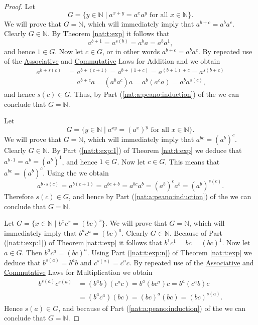 \begin{proof}
	\hfill

	Let
	$$
		G = \{ y \in \mathbb{N} \mid  a^{x + y} = a^x a^y \text{ for all } x \in \mathbb{N} \}.
	$$
	We will prove that $G = \mathbb{N}$, which will immediately imply that $a^{b + c} = a^b a^c$. Clearly $G \in \mathbb{N}$. By Theorem \ref{nat:t:exp} it follows that
	$$
		a^{b + 1} = a^{s(b)} = a^b a = a^b a^1,
	$$
	and hence $1 \in G$. Now let $c \in G$, or in other words $a^{b + c} = a^b a^c$. By repeated use of the \hyperref[nat:t:props:associative_add]{Associative} and \hyperref[nat:t:props:commutative_add]{Commutative} Laws for Addition and  we obtain
	\begin{align*}
		a^{b + s(c)} & = a^{b + (c + 1)} = a^{b + (1 + c)} = a^{(b + 1) + c} = a^{s(b + c)} \\
		             & = a^{b + c} a  = (a^b a^c)a = a^b (a^c a) = a^b a^{s(c)},
	\end{align*}
	and hence $s(c) \in G$. Thus, by Part (\ref{nat:a:peano:induction}) of the  we can conclude that $G = \mathbb{N}$.

	Let
	$$
		G = \{ y \in \mathbb{N} \mid  a^{x y} = (a^x)^y \text{ for all } x \in \mathbb{N} \}.
	$$
	We will prove that $G = \mathbb{N}$, which will immediately imply that $a^{b c} = (a^b)^c$. Clearly $G \in \mathbb{N}$. By Part (\ref{nat:t:exp:1}) of Theorem \ref{nat:t:exp} we deduce that $a^{b \cdot 1} = a^b = (a^b)^1$, and hence $1 \in G$. Now let $c \in G$. This means that $a^{b c} = (a^b)^c$. Using the  we obtain
	$$
		a^{b \cdot s(c)} = a^{b(c + 1)} = a^{b c + b} = a^{b c} a^b = (a^b)^c a^b = (a^b)^{s(c)}.
	$$
	Therefore $s(c) \in G$, and hence by Part (\ref{nat:a:peano:induction}) of the  we can conclude that $G = \mathbb{N}$.

	Let $G = \{ x \in \mathbb{N} \mid  b^x c^x = (b c)^x \}$. We will prove that $G = \mathbb{N}$, which will immediately imply that $b^a c^a = (b c)^a$. Clearly $G \in \mathbb{N}$. Because of Part (\ref{nat:t:exp:1}) of Theorem\,\ref{nat:t:exp} it follows that $b^1 c^1 = b c = (b c)^1$. Now let $a \in G$. Then $b^a c^a = (b c)^a$. Using Part (\ref{nat:t:exp:n}) of Theorem \ref{nat:t:exp} we deduce that $b^{s(a)} = b^a b$ and $c^{s(a)} = c^a c$. By repeated use of the \hyperref[nat:t:props:associative_mult]{Associative} and \hyperref[nat:t:props:commutative_mult]{Commutative} Laws for Multiplication we obtain
	\begin{align*}
		b^{s(a)} c^{s(a)} & = (b^a b)(c^a c) = b^a (b c^a) c = b^a (c^a b) c \\
		                  & = (b^a c^a)(b c) = (b c)^a (b c) = (b c)^{s(a)}.
	\end{align*}
	Hence $s(a) \in G$, and because of Part (\ref{nat:a:peano:induction}) of the  we can conclude that $G = \mathbb{N}$.
\end{proof}